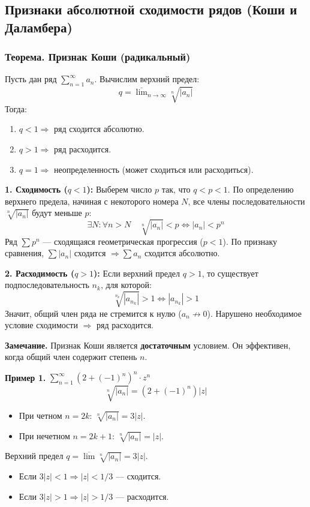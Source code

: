 \subsection{Признаки абсолютной сходимости рядов (Коши и Даламбера)}

\subsubsection*{Теорема. Признак Коши (радикальный)}
Пусть дан ряд $\sum_{n=1}^\infty a_n$. Вычислим верхний предел:
\[ q = \overline{\lim}_{n\to\infty} \sqrt[n]{|a_n|} \]
Тогда:
\begin{enumerate}
    \item $q < 1 \Rightarrow$ ряд сходится абсолютно.
    \item $q > 1 \Rightarrow$ ряд расходится.
    \item $q = 1 \Rightarrow$ неопределенность (может сходиться или расходиться).
\end{enumerate}

\begin{tcolorbox}[title=Доказательство]
    \textbf{1. Сходимость ($q < 1$):}
    Выберем число $p$ так, что $q < p < 1$.
    По определению верхнего предела, начиная с некоторого номера $N$, все члены последовательности $\sqrt[n]{|a_n|}$ будут меньше $p$:
    \[ \exists N: \forall n > N \quad \sqrt[n]{|a_n|} < p \iff |a_n| < p^n \]
    Ряд $\sum p^n$ — сходящаяся геометрическая прогрессия ($p < 1$).
    По признаку сравнения, $\sum |a_n|$ сходится $\Rightarrow \sum a_n$ сходится абсолютно.

    \textbf{2. Расходимость ($q > 1$):}
    Если верхний предел $q > 1$, то существует подпоследовательность $n_k$, для которой:
    \[ \sqrt[n_k]{|a_{n_k}|} > 1 \iff |a_{n_k}| > 1 \]
    Значит, общий член ряда не стремится к нулю ($a_n \not\to 0$).
    Нарушено необходимое условие сходимости $\Rightarrow$ ряд расходится.
\end{tcolorbox}

\textbf{Замечание.} Признак Коши является \textbf{достаточным} условием. Он эффективен, когда общий член содержит степень $n$.

\textbf{Пример 1.} $\sum_{n=1}^\infty (2+(-1)^n)^n \cdot z^n$
\[ \sqrt[n]{|a_n|} = (2+(-1)^n)|z| \]
\begin{itemize}
    \item При четном $n=2k$: $\sqrt[n]{|a_n|} = 3|z|$.
    \item При нечетном $n=2k+1$: $\sqrt[n]{|a_n|} = |z|$.
\end{itemize}
Верхний предел $q = \overline{\lim} \sqrt[n]{|a_n|} = 3|z|$.
\begin{itemize}
    \item Если $3|z| < 1 \Rightarrow |z| < 1/3$ — сходится.
    \item Если $3|z| > 1 \Rightarrow |z| > 1/3$ — расходится.
\end{itemize}

